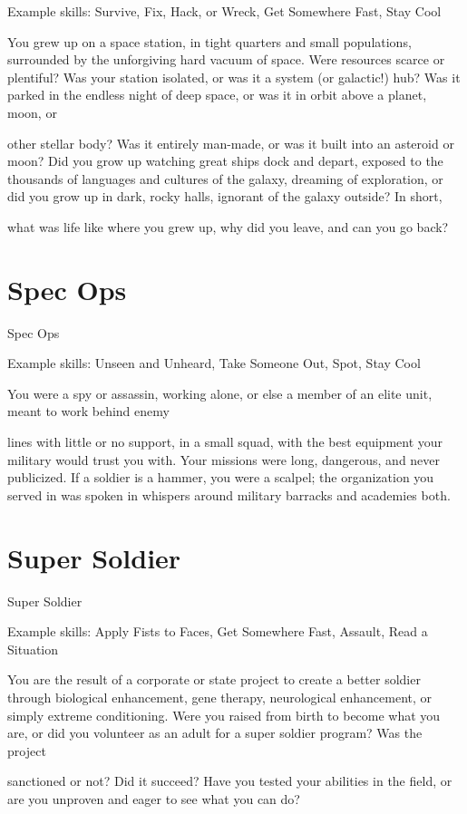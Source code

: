 Example skills: Survive, Fix, Hack, or Wreck, Get Somewhere Fast, Stay Cool

You grew up on a space station, in tight quarters and small populations, surrounded by the unforgiving hard
vacuum of space. Were resources scarce or plentiful? Was your station isolated, or was it a system (or
galactic!) hub? Was it parked in the endless night of deep space, or was it in orbit above a planet, moon, or

other stellar body? Was it entirely man-made, or was it built into an asteroid or moon? Did you grow up
watching great ships dock and depart, exposed to the thousands of languages and cultures of the galaxy,
dreaming of exploration, or did you grow up in dark, rocky halls, ignorant of the galaxy outside? In short,

what was life like where you grew up, why did you leave, and can you go back?
\section{Spec Ops}
                                                     Spec Ops

Example skills: Unseen and Unheard, Take Someone Out, Spot, Stay Cool

You were a spy or assassin, working alone, or else a member of an elite unit, meant to work behind enemy

lines with little or no support, in a small squad, with the best equipment your military would trust you with.
Your missions were long, dangerous, and never publicized. If a soldier is a hammer, you were a scalpel; the
organization you served in was spoken in whispers around military barracks and academies both.
\section{Super Soldier}
                                                 Super Soldier

Example skills: Apply Fists to Faces, Get Somewhere Fast, Assault, Read a Situation

You are the result of a corporate or state project to create a better soldier through biological enhancement,
gene therapy, neurological enhancement, or simply extreme conditioning. Were you raised from birth to
become what you are, or did you volunteer as an adult for a super soldier program? Was the project

sanctioned or not? Did it succeed? Have you tested your abilities in the field, or are you unproven and
eager to see what you can do?



